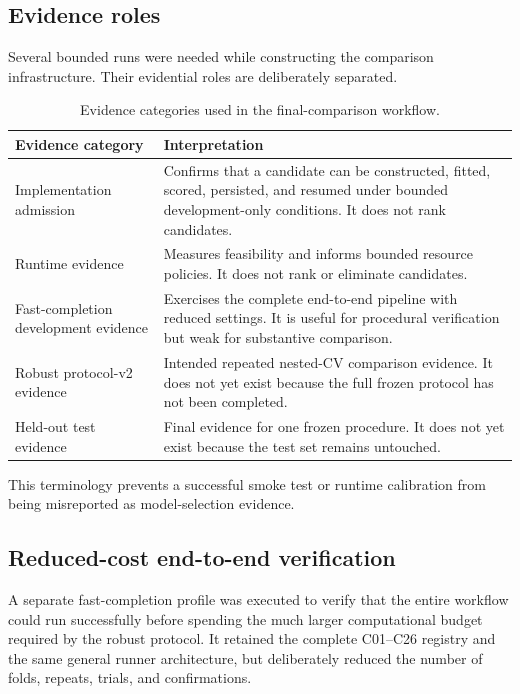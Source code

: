 \subsection{Evidence roles}

Several bounded runs were needed while constructing the comparison infrastructure. Their evidential roles are deliberately separated.

\begin{table}[H]
\centering
\caption{Evidence categories used in the final-comparison workflow.}
\label{tab:final-comparison-evidence-roles}
\begin{tabular}{p{4.2cm}p{9.0cm}}
\toprule
Evidence category & Interpretation \\
\midrule
Implementation admission & Confirms that a candidate can be constructed, fitted, scored, persisted, and resumed under bounded development-only conditions. It does not rank candidates. \\
Runtime evidence & Measures feasibility and informs bounded resource policies. It does not rank or eliminate candidates. \\
Fast-completion development evidence & Exercises the complete end-to-end pipeline with reduced settings. It is useful for procedural verification but weak for substantive comparison. \\
Robust protocol-v2 evidence & Intended repeated nested-CV comparison evidence. It does not yet exist because the full frozen protocol has not been completed. \\
Held-out test evidence & Final evidence for one frozen procedure. It does not yet exist because the test set remains untouched. \\
\bottomrule
\end{tabular}
\end{table}

This terminology prevents a successful smoke test or runtime calibration from being misreported as model-selection evidence.

\subsection{Reduced-cost end-to-end verification}

A separate fast-completion profile was executed to verify that the entire workflow could run successfully before spending the much larger computational budget required by the robust protocol. It retained the complete C01--C26 registry and the same general runner architecture, but deliberately reduced the number of folds, repeats, trials, and confirmations.

